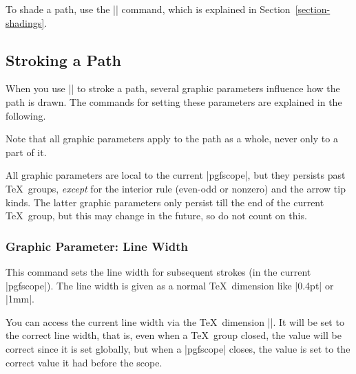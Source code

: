To shade a path, use the |\pgfshadepath| command, which is explained in
Section~\ref{section-shadings}.


\subsection{Stroking a Path}
\label{section-stroke}

When you use || to stroke a path, several graphic parameters
influence how the path is drawn. The commands for setting these parameters are
explained in the following.

Note that all graphic parameters apply to the path as a whole, never only to a
part of it.

All graphic parameters are local to the current |{pgfscope}|, but they persists
past \TeX\ groups, \emph{except} for the interior rule (even-odd or nonzero)
and the arrow tip kinds. The latter graphic parameters only persist till the
end of the current \TeX\ group, but this may change in the future, so do not
count on this.


\subsubsection{Graphic Parameter: Line Width}

\begin{command}{\pgfsetlinewidth{}}
    This command sets the line width for subsequent strokes (in the current
    |pgfscope|). The line width is given as a normal \TeX\ dimension like
    |0.4pt| or |1mm|.
\begin{codeexample}[]
\begin{pgfpicture}
  \pgfsetlinewidth{1mm}
  \pgfpathmoveto{\pgfpoint{0mm}{0mm}}
  \pgfpathlineto{\pgfpoint{2cm}{0mm}}
  \pgfsetlinewidth{2\pgflinewidth} %
  \pgfpathmoveto{\pgfpoint{0mm}{5mm}}
  \pgfpathlineto{\pgfpoint{2cm}{5mm}}
\end{pgfpicture}
\end{codeexample}
\end{command}

\begin{textoken}{\pgflinewidth}
    You can access the current line width via the \TeX\ dimension
    |\pgflinewidth|. It will be set to the correct line width, that is, even
    when a \TeX\ group closed, the value will be correct since it is set
    globally, but when a |{pgfscope}| closes, the value is set to the correct
    value it had before the scope.
\end{textoken}



